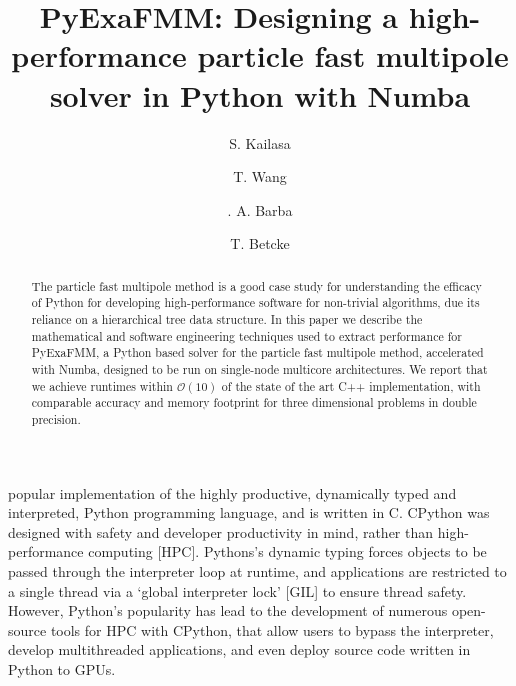 \documentclass{IEEEcsmag}
\begin{document}

\title{PyExaFMM: Designing a high-performance particle fast multipole solver in Python with Numba}

\author{S. Kailasa}

\author{T. Wang}

\author{. A. Barba}

\author{T. Betcke}


\begin{abstract}
The particle fast multipole method is a good case study for understanding the efficacy of Python for developing high-performance software for non-trivial algorithms, due its reliance on a hierarchical tree data structure. In this paper we describe the mathematical and software engineering techniques used to extract performance for PyExaFMM, a Python based solver for the particle fast multipole method, accelerated with Numba, designed to be run on single-node multicore architectures. We report that we achieve runtimes within $\mathcal{O}(10)$ of the state of the art C++ implementation, with comparable accuracy and memory footprint for three dimensional problems in double precision.
\end{abstract}

\maketitle
{} popular implementation of the highly productive, dynamically typed and interpreted, Python programming language, and is written in C. CPython was designed with safety and developer productivity in mind, rather than high-performance computing [HPC]. Pythons's dynamic typing forces objects to be passed through the interpreter loop at runtime, and applications are restricted to a single thread via a `global interpreter lock' [GIL] to ensure thread safety. However, Python's popularity has lead to the development of numerous open-source tools for HPC with CPython, that allow users to bypass the interpreter, develop multithreaded applications, and even deploy source code written in Python to GPUs.
\end{document}
